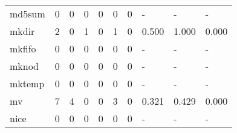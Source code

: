 \begin{longtable}{lp{1.3cm}p{1.3cm}p{1.3cm}p{1.3cm}p{1.3cm}p{1.3cm}p{1.3cm}p{1.3cm}p{1.3cm}}
md5sum    &                      0 &                                  0 &                                 0 &                                0 &                                 0 &                               0 &                                    - &                                      - &                                    - \\
mkdir     &                      2 &                                  0 &                                 1 &                                0 &                                 1 &                               0 &                                0.500 &                                  1.000 &                                0.000 \\
mkfifo    &                      0 &                                  0 &                                 0 &                                0 &                                 0 &                               0 &                                    - &                                      - &                                    - \\
mknod     &                      0 &                                  0 &                                 0 &                                0 &                                 0 &                               0 &                                    - &                                      - &                                    - \\
mktemp    &                      0 &                                  0 &                                 0 &                                0 &                                 0 &                               0 &                                    - &                                      - &                                    - \\
mv        &                      7 &                                  4 &                                 0 &                                0 &                                 3 &                               0 &                                0.321 &                                  0.429 &                                0.000 \\
nice      &                      0 &                                  0 &                                 0 &                                0 &                                 0 &                               0 &                                    - &                                      - &                                    - \\

\end{longtable}
